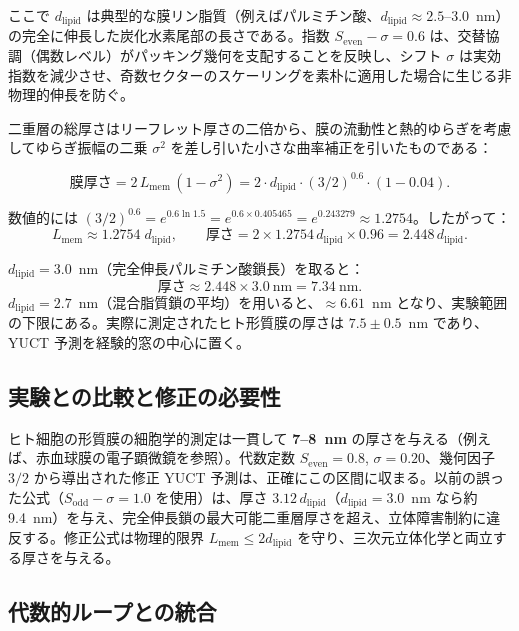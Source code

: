 \documentclass[12pt,a4paper]{article}
\begin{document}
	ここで \(d_{\mathrm{lipid}}\) は典型的な膜リン脂質（例えばパルミチン酸、\(d_{\mathrm{lipid}} \approx 2.5\)–\(3.0\)~nm）の完全に伸長した炭化水素尾部の長さである。指数 \(S_{\mathrm{even}} - \sigma = 0.6\) は、交替協調（偶数レベル）がパッキング幾何を支配することを反映し、シフト \(\sigma\) は実効指数を減少させ、奇数セクターのスケーリングを素朴に適用した場合に生じる非物理的伸長を防ぐ。
	
	二重層の総厚さはリーフレット厚さの二倍から、膜の流動性と熱的ゆらぎを考慮してゆらぎ振幅の二乗 \(\sigma^2\) を差し引いた小さな曲率補正を引いたものである：
	
	\[
	\text{膜厚さ} = 2 \, L_{\mathrm{mem}} \, (1 - \sigma^2)
	= 2 \cdot d_{\mathrm{lipid}} \cdot (3/2)^{0.6} \cdot (1 - 0.04).
	\]
	
	数値的には \((3/2)^{0.6} = e^{0.6 \ln 1.5} = e^{0.6 \times 0.405465} = e^{0.243279} \approx 1.2754\)。したがって：
	\[
	L_{\mathrm{mem}} \approx 1.2754 \; d_{\mathrm{lipid}}, \qquad
	\text{厚さ} = 2 \times 1.2754 \, d_{\mathrm{lipid}} \times 0.96 = 2.448 \, d_{\mathrm{lipid}}.
	\]
	
	\(d_{\mathrm{lipid}} = 3.0\)~nm（完全伸長パルミチン酸鎖長）を取ると：
	\[
	\text{厚さ} \approx 2.448 \times 3.0\ \text{nm} = 7.34\ \text{nm}.
	\]
	\(d_{\mathrm{lipid}} = 2.7\)~nm（混合脂質鎖の平均）を用いると、\(\approx 6.61\)~nm となり、実験範囲の下限にある。実際に測定されたヒト形質膜の厚さは \(7.5 \pm 0.5\)~nm であり、YUCT 予測を経験的窓の中心に置く。
	
	\subsection*{実験との比較と修正の必要性}
	
	ヒト細胞の形質膜の細胞学的測定は一貫して \textbf{7–8~nm} の厚さを与える（例えば、赤血球膜の電子顕微鏡を参照）。代数定数 \(S_{\mathrm{even}} = 0.8\), \(\sigma = 0.20\)、幾何因子 \(3/2\) から導出された修正 YUCT 予測は、正確にこの区間に収まる。以前の誤った公式（\(S_{\mathrm{odd}}-\sigma = 1.0\) を使用）は、厚さ \(3.12 \, d_{\mathrm{lipid}}\)（\(d_{\mathrm{lipid}}=3.0\)~nm なら約 9.4~nm）を与え、完全伸長鎖の最大可能二重層厚さを超え、立体障害制約に違反する。修正公式は物理的限界 \(L_{\mathrm{mem}} \le 2 d_{\mathrm{lipid}}\) を守り、三次元立体化学と両立する厚さを与える。
	
	\subsection*{代数的ループとの統合}
	
\end{document}

